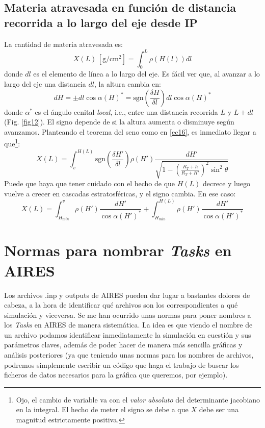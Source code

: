\documentclass[a4paper,12pt]{article}
\numberwithin{equation}{section}
\numberwithin{figure}{section}
\begin{document}
\subsection{Materia atravesada en función de distancia recorrida a lo largo del eje desde IP}
La cantidad de materia atravesada es:
\begin{equation}
	X(L)\,\left[\mathrm{g/cm^2}\right]=\int_{0}^L\rho(H(l))dl\label{ec18}
\end{equation}
donde $dl$ es el elemento de línea a lo largo del eje. Es fácil ver que, al avanzar a lo largo del eje una distancia $dl$, la altura cambia en:
\begin{equation}
	dH = \pm dl \cos{\alpha(H)^*} = \mathrm{sgn}\left(\frac{\delta H}{\delta l}\right) dl \cos{\alpha(H)^*}\label{ec19}
\end{equation}
donde $\alpha^*$ es el ángulo cenital \textit{local}, i.e., entre una distancia recorrida $L$ y $L+dl$ (Fig. \ref{fig12}). El signo depende de si la altura aumenta o disminuye según avanzamos. Planteando el teorema del seno como en \eqref{ec16}, es inmediato llegar a que\footnote{ Ojo, el cambio de variable va con el \textit{valor absoluto} del determinante jacobiano en la integral. El hecho de meter el signo se debe a que $X$ debe ser una magnitud estrictamente positiva.}:
\begin{equation}
	X(L) = \int_{v}^{H(L)}\mathrm{sgn}\left(\frac{\delta H'}{\delta l}\right)\rho(H')\frac{dH'}{\sqrt{1-\left(\frac{R_T+h}{R_T+H'}\right)^2\sin^2\theta}}\label{ec110}
\end{equation}
Puede que haya que tener cuidado con el hecho de que $H(L)$ decrece y luego vuelve a crecer en cascadas estratosféricas, y el signo cambia. En ese caso:
\begin{equation}
	X(L) = \int_{H_{min}}^{v}\rho(H')\frac{dH'}{\cos\alpha(H')^*}+\int_{H_{min}}^{H(L)}\rho(H')\frac{dH'}{\cos\alpha(H')^*}\label{ec111}
\end{equation}

\section{Normas para nombrar \textit{Tasks} en AIRES}
Los archivos .inp y outputs de AIRES pueden dar lugar a bastantes dolores de cabeza, a la hora de identificar qué archivos son los correspondientes a qué simulación y viceversa. Se me han ocurrido unas normas para poner nombres a los \textit{Tasks} en AIRES de manera sistemática. La idea es que viendo el nombre de un archivo podamos identificar inmediatamente la simulación en cuestión y sus parámetros claves, además de poder hacer de manera más sencilla gráficas y análisis posteriores (ya que teniendo unas normas para los nombres de archivos, podremos simplemente escribir un código que haga el trabajo de buscar los ficheros de datos necesarios para la gráfica que queremos, por ejemplo).
\end{document}
